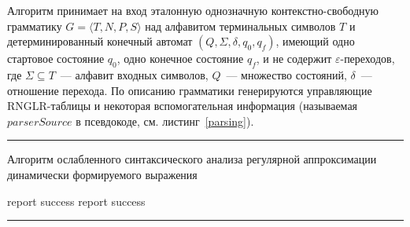 Алгоритм принимает на вход эталонную однозначную контекстно-свободную грамматику $G=\langle T, N, P, S \rangle$ над алфавитом терминальных символов $T$ и детерминированный конечный автомат $(Q,\Sigma,\delta,q_0,q_f)$, имеющий одно стартовое состояние $q_0$, одно конечное состояние $q_f$, и не содержит $\varepsilon$-переходов, где $\Sigma \subseteq T$~--- алфавит входных символов, $Q$~--- множество состояний, $\delta$~--- отношение перехода. По описанию  грамматики генерируются управляющие RNGLR-таблицы и некоторая вспомогательная информация (называемая $parserSource$ в псевдокоде, см. листинг~\ref{parsing}). 

\begin{listing}[!ht]
\hrule

\begin{algorithmic}[1]
\caption{Алгоритм ослабленного синтаксического анализа регулярной аппроксимации динамически формируемого выражения}
\label{parsing}
     {report success}
    \EndIf
  \Else
    \EndWhile
     {report success}
    \EndIf
  \EndIf
\EndFunction
\end{algorithmic}

\hrule
\end{listing}


